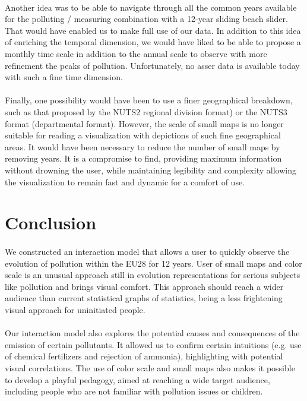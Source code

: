 \documentclass[preprint,journal]{vgtc}       %
\begin{document}
\paragraph{}		
Another idea was to be able to navigate through all the common years available for the polluting / measuring combination with a 12-year sliding beach slider. That would have enabled us to make full use of our data. In addition to this idea of ​​enriching the temporal dimension, we would have liked to be able to propose a monthly time scale in addition to the annual scale to observe with more refinement the peaks of pollution. Unfortunately, no asser data is available today with such a fine time dimension.

\paragraph{}
Finally, one possibility would have been to use a finer geographical breakdown, such as that proposed by the NUTS2 regional division format) or the NUTS3 format (departmental format). However, the scale of small maps is no longer suitable for reading a visualization with depictions of such fine geographical areas. It would have been necessary to reduce the number of small maps by removing years. It is a compromise to find, providing maximum information without drowning the user, while maintaining legibility and complexity allowing the visualization to remain fast and dynamic for a comfort of use.


\section{Conclusion}

\paragraph{}
We constructed an interaction model that allows a user to quickly observe the evolution of pollution within the EU28 for 12 years. User of small maps and color scale is an unusual approach still in evolution representations for serious subjects like pollution and brings visual comfort. This approach should reach a wider audience than current statistical graphs of statistics, being a less frightening visual approach for uninitiated people.

\paragraph{}
Our interaction model also explores the potential causes and consequences of the emission of certain pollutants. It allowed us to confirm certain intuitions (e.g. use of chemical fertilizers and rejection of ammonia), highlighting with potential visual correlations. The use of color scale and small maps also makes it possible to develop a playful pedagogy, aimed at reaching a wide target audience, including people who are not familiar with pollution issues or children. 
\end{document}
